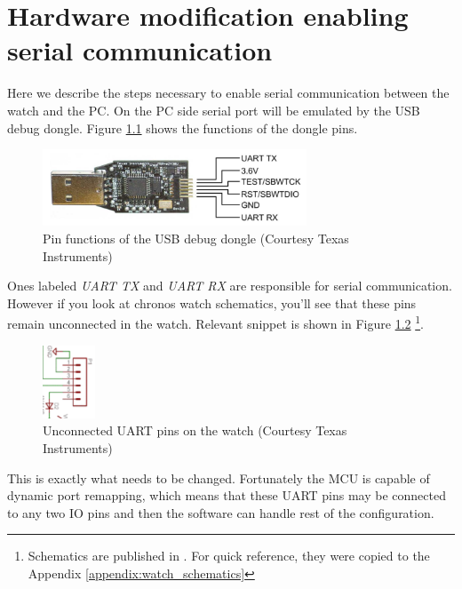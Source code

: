 \appendix
\chapter{Hardware modification enabling serial communication}
\label{appendix:uart_pins}

Here we describe the steps necessary to enable serial communication
between the watch and the PC. On the PC side serial port will be
emulated by the USB debug dongle. Figure \ref{fig:chronos_dongle_pins}
shows the functions of the dongle pins.
\begin{figure}[h]
  \centering
  \includegraphics[width=0.7\textwidth]{img/chronos_dongle_pins.png}
  \caption{Pin functions of the USB debug dongle (Courtesy Texas Instruments)}
  \label{fig:chronos_dongle_pins}
\end{figure}
Ones labeled \emph{UART TX} and \emph{UART RX} are responsible for
serial communication. However if you look at chronos watch schematics,
you'll see that these pins remain unconnected in the watch. Relevant
snippet is shown in Figure \ref{fig:chronos_unonnected_uart}
\footnote{Schematics are published in \cite{eZ430Chronos}. For quick
reference, they were copied to the Appendix
\ref{appendix:watch_schematics}}.
\begin{figure}[h]
  \centering
  \includegraphics[width=0.14\textwidth]{img/chronos_unonnected_uart.png}
  \caption{Unconnected UART pins on the watch (Courtesy Texas Instruments)}
  \label{fig:chronos_unonnected_uart}
\end{figure}
This is exactly what needs to be changed. Fortunately the MCU is
capable of dynamic port remapping, which means that these UART pins may
be connected to any two IO pins and then the software can handle rest of the
configuration.


